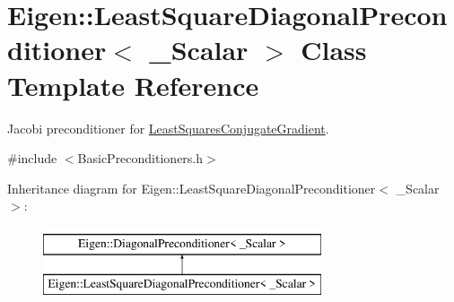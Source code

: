 \hypertarget{class_eigen_1_1_least_square_diagonal_preconditioner}{}\section{Eigen\+::Least\+Square\+Diagonal\+Preconditioner$<$ \+\_\+\+Scalar $>$ Class Template Reference}
\label{class_eigen_1_1_least_square_diagonal_preconditioner}


Jacobi preconditioner for \mbox{\hyperlink{class_eigen_1_1_least_squares_conjugate_gradient}{Least\+Squares\+Conjugate\+Gradient}}.  




{\ttfamily \#include $<$Basic\+Preconditioners.\+h$>$}

Inheritance diagram for Eigen\+::Least\+Square\+Diagonal\+Preconditioner$<$ \+\_\+\+Scalar $>$\+:\begin{figure}[H]
\begin{center}
\leavevmode
\includegraphics[height=2.000000cm]{class_eigen_1_1_least_square_diagonal_preconditioner}
\end{center}
\end{figure}
